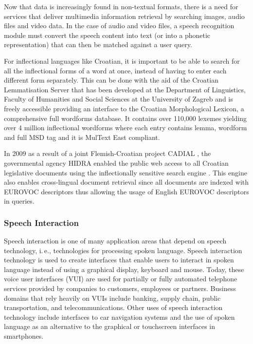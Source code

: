 \begin{multicols}{2}
Now that data is increasingly found in non-textual formats, there is a need for services that deliver multimedia information retrieval by searching images, audio files and video data. In the case of audio and video files, a speech recognition module must convert the speech content into text (or into a phonetic representation) that can then be matched against a user query.

For inflectional languages like Croatian, it is important to be able to search for all the inflectional forms of a word at once, instead of having to enter each different form separately. This can be done with the aid of the Croatian Lemmatisation Server that has been developed at the Department of Linguistics, Faculty of Humanities and Social Sciences at the University of Zagreb and is freely accessible \cite{str16} providing an interface to the Croatian Morphological Lexicon, a comprehensive full wordforms database. It contains over 110,000 lexemes yielding over 4 million inflectional wordforms where each entry contains lemma, wordform and full MSD tag and it is MulText East \cite{str17} compliant.

In 2009 as a result of a joint Flemish-Croatian project CADIAL \cite{str18}, the governmental agency HIDRA enabled the public web access to all Croatian legislative documents using the inflectionally sensitive search engine \cite{str19}. This engine also enables cross-lingual document retrieval since all documents are indexed with EUROVOC descriptors thus allowing the usage of English EUROVOC descriptors in queries.

\subsubsection{Speech Interaction}

Speech interaction is one of many application areas that depend on speech technology, i.\,e., technologies for processing spoken language. Speech interaction technology is used to create interfaces that enable users to interact in spoken language instead of using a graphical display, keyboard and mouse.  Today, these voice user interfaces (VUI) are used for partially or fully automated telephone services provided by companies to customers, employees or partners. Business domains that rely heavily on VUIs include banking, supply chain, public transportation, and telecommunications. Other uses of speech interaction technology include interfaces to car navigation systems and the use of spoken language as an alternative to the graphical or touchscreen interfaces in smartphones.


\end{multicols}
